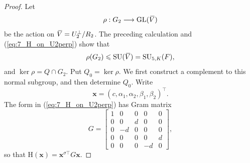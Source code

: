 \documentclass{amsart}
\def\ovV{\mathord{\mbox{\hspace*{0pt}}\,\overline{\!V\!\!\;}\!\:}\mbox{\hspace*{0pt}}}
\newcommand{\GL}{\mathrm{GL}}
\newcommand{\SU}{\mathrm{SU}}
\renewcommand{\H}{\mathrm{H}}
\newcommand{\s}{\sigma}
\renewcommand{\ker}{\operatorname{ker}}
\newcommand{\T}{\top}
\theoremstyle{plain}
\numberwithin{theorem}{section}
\theoremstyle{definition}
\begin{document}
\begin{proof}
	Let
	\begin{equation}
		\rho:G_2\longrightarrow\GL(\ovV)
	\end{equation}
	be the action on $\ovV=U_2^{\perp}/R_2$.  The preceding calculation and
	(\ref{eq:7_H_on_U2perp}) show that
	\begin{equation}
		\rho(G_2)\leqslant\SU(\ovV)=\SU_{5,K}(F),
	\end{equation}
	and $\ker\rho=Q\cap G_2$.  Put $Q_0=\ker\rho$.  We first construct a
	complement to this normal subgroup, and then determine $Q_0$.
	Write
	\begin{equation*}
		\mathbf x=(c,\alpha_1,\alpha_2,\beta_1,\beta_2)^{\T}.
	\end{equation*}
	The form in
	(\ref{eq:7_H_on_U2perp}) has Gram matrix
	\begin{equation}
		\label{eq:7_type2_Gram}
		G=\begin{bmatrix}
		1&0&0&0&0\\
		0&0&d&0&0\\
		0&-d&0&0&0\\
		0&0&0&0&d\\
		0&0&0&-d&0
		\end{bmatrix},
	\end{equation}
	so that $\H(\mathbf x)=\mathbf x^{\s\T}G\mathbf x$.


\end{proof}
\end{document}
